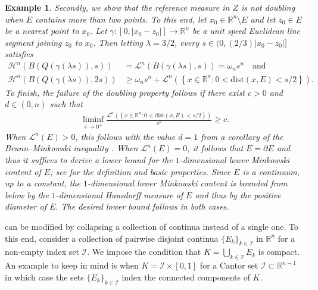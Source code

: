 \documentclass[reqno]{amsart}
\numberwithin{equation}{section}
\newtheorem{example}[theorem]{Example}
\theoremstyle{remark}
\begin{document}
\begin{example}
{Secondly, we show that the reference measure in $Z$ is not doubling when $E$ contains more than two points. To this end, let $x_0 \in \mathbb{R}^n \setminus E$ and let $z_0 \in E$ be a nearest point to $x_0$. Let $\gamma \colon [0,|x_0-z_0|] \rightarrow \mathbb{R}^n$ be a unit speed Euclidean line segment joining $z_0$ to $x_0$. Then letting $\lambda = 3/2$, every $s\in (0,(2/3)|x_0-z_0|]$ satisfies
\begin{align*}
    \mathcal{H}^{n}\left( B\left( Q\left(\gamma\left( \lambda s \right) \right), s \right) \right)
    &=
    \mathcal{L}^{n}( B( \gamma(\lambda s ), s ) )
    =
    \omega_n s^n
    \quad\text{and}\quad
    \\
    \mathcal{H}^{n}\left( B\left( Q\left( \gamma\left( \lambda s \right) \right), 2s \right) \right)
    &\geq
    \omega_n s^n
    +
    \mathcal{L}^{n}\left( \left\{ x \in \mathbb{R}^n \colon 0 < \mathrm{dist}( x, E ) < s/2 \right\} \right).
\end{align*}
To finish, the failure of the doubling property follows if there exist $c > 0$ and $d \in (0,n)$ such that
\begin{align*}
    \liminf_{ s \rightarrow 0^{+} }
    \frac{ \mathcal{L}^{n}( \left\{ x \in \mathbb{R}^n \colon 0 < \mathrm{dist}( x, E ) < s/2 \right\} ) }{ s^d }
    \geq
    c.
\end{align*}
When $\mathcal{L}^{n}(E) > 0$, this follows with the value $d=1$ from a corollary of the Brunn--Minkowski inequality \cite[3.2.42]{Fed:69}. When $\mathcal{L}^{n}(E) = 0$, it follows that $E = \partial E$ and thus it suffices to derive a lower bound for the $1$-dimensional lower Minkowski content of $E$; see \cite[Section 5.5]{Mattila:95} for the definition and basic properties. Since $E$ is a continuum, up to a constant, the $1$-dimensional lower Minkowski content is bounded from below by the $1$-dimensional Hausdorff measure of $E$ and thus by the positive diameter of $E$. The desired lower bound follows in both cases.}
\end{example}
 can be modified by collapsing a collection of continua instead of a single one. To this end, consider a collection of pairwise disjoint continua $\{ E_k \}_{ k \in \mathcal{I} }$ in $\mathbb{R}^n$ for a non-empty index set $\mathcal{I}$. We impose the condition that $K = \bigcup_{ k \in \mathcal{I} } E_k$ is compact. An example to keep in mind is when $K = \mathcal{I} \times [0,1]$ for a Cantor set $\mathcal{I} \subset \mathbb{R}^{n-1}$ in which case the sets $\{  E_k \}_{ k \in \mathcal{I} }$ index the connected components of $K$.
\end{document}
